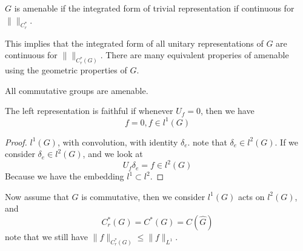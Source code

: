 \begin{definition}
    $G$ is amenable if the integrated form of trivial representation if continuous for $\|\|_{C_r^*}$.
\end{definition}
\begin{remark}
    This implies that the integrated form of all unitary representations of $G$ are continuous for $\| \|_{C_r^*(G)}$. There are many equivalent properies of amenable using the geometric properties of $G$.
\end{remark}
\begin{note}
    All commutative groups are amenable.
\end{note}

\begin{definition}
    The left representation is faithful if whenever $U_f=0$, then we have
    \begin{equation*}
        f=0, f\in l^1(G)
    \end{equation*}
\end{definition}
\begin{proof}
    $l^1(G)$, with convolution, with identity $\delta_e$. note that $\delta_e\in l^2(G)$. If we consider $\delta_e\in l^2(G)$, and we look at 
    \begin{equation*}
        U_f\delta_e=f\in l^2(G)
    \end{equation*}
    Because we have the embedding $l^1\subset l^2$. 
\end{proof}

Now assume that $G$ is commutative, then we consider $l^1(G)$ acts on $l^2(G)$, and 
\begin{equation*}
    C_r^*(G)=C^*(G)=C(\widehat{G})
\end{equation*}
note that we still have $\|f\|_{C_r^*(G)}\leq\|f\|_{L^1}$.


